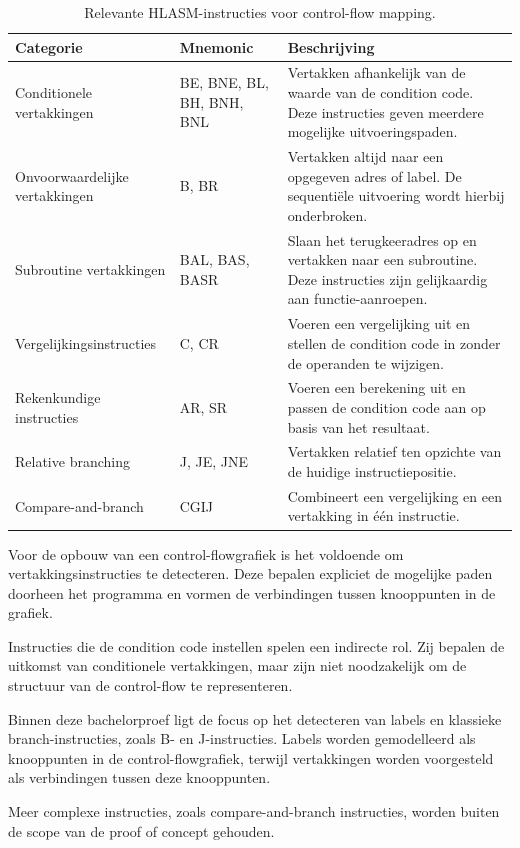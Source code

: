 \newpage

\begin{table}[h!]
    \centering
    \small
    \begin{tabular}{|p{4cm}|p{4cm}|p{7cm}|}
        \hline
        \textbf{Categorie} & \textbf{Mnemonic} & \textbf{Beschrijving} \\
        \hline
        Conditionele vertakkingen & BE, BNE, BL, BH, BNH, BNL & Vertakken afhankelijk van de waarde van de condition code. Deze instructies geven meerdere mogelijke uitvoeringspaden. \\
        \hline
        Onvoorwaardelijke vertakkingen & B, BR & Vertakken altijd naar een opgegeven adres of label. De sequentiële uitvoering wordt hierbij onderbroken. \\
        \hline
        Subroutine vertakkingen & BAL, BAS, BASR & Slaan het terugkeeradres op en vertakken naar een subroutine. Deze instructies zijn gelijkaardig aan functie-aanroepen. \\
        \hline
        Vergelijkingsinstructies & C, CR & Voeren een vergelijking uit en stellen de condition code in zonder de operanden te wijzigen. \\
        \hline
        Rekenkundige instructies & AR, SR & Voeren een berekening uit en passen de condition code aan op basis van het resultaat. \\
        \hline
        Relative branching & J, JE, JNE & Vertakken relatief ten opzichte van de huidige instructiepositie. \\
        \hline
        Compare-and-branch & CGIJ & Combineert een vergelijking en een vertakking in één instructie. \\
        \hline
    \end{tabular}
    \caption{Relevante HLASM-instructies voor control-flow mapping.}
    \label{tab:cf__instructions}
\end{table}

Voor de opbouw van een control-flowgrafiek is het voldoende om vertakkingsinstructies te detecteren. Deze bepalen expliciet de mogelijke paden doorheen het programma en vormen de verbindingen tussen knooppunten in de grafiek.

Instructies die de condition code instellen spelen een indirecte rol. Zij bepalen de uitkomst van conditionele vertakkingen, maar zijn niet noodzakelijk om de structuur van de control-flow te representeren.

Binnen deze bachelorproef ligt de focus op het detecteren van labels en klassieke branch-instructies, zoals B- en J-instructies. Labels worden gemodelleerd als knooppunten in de control-flowgrafiek, terwijl vertakkingen worden voorgesteld als verbindingen tussen deze knooppunten.

Meer complexe instructies, zoals compare-and-branch instructies, worden buiten de scope van de proof of concept gehouden.

